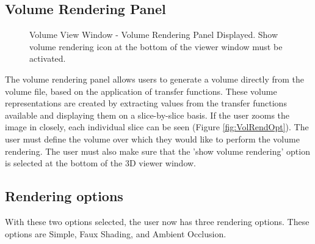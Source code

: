 \documentclass[fleqn,11pt,openany]{book}
\begin{document}
\subsection{Volume Rendering Panel}

\begin{figure}[b!]
\caption{Volume View Window - Volume Rendering Panel Displayed. Show volume rendering icon at the bottom of the viewer window must be activated.}\label{fig:VolRendPanel}
\end{figure}

The volume rendering panel allows users to generate a volume directly from the volume file, based on the application of transfer functions.
These volume representations are created by extracting values from the transfer functions available and displaying them on a slice-by-slice basis.
If the user zooms the image in closely, each individual slice can be seen (Figure \ref{fig:VolRendOpt}).
The user must define the volume over which they would like to perform the volume rendering.
The user must also make sure that the 'show volume rendering' option is selected at the bottom of the 3D viewer window.

\subsection{Rendering options}

With these two options selected, the user now has three rendering options.
These options are Simple, Faux Shading, and Ambient Occlusion.
\end{document}
